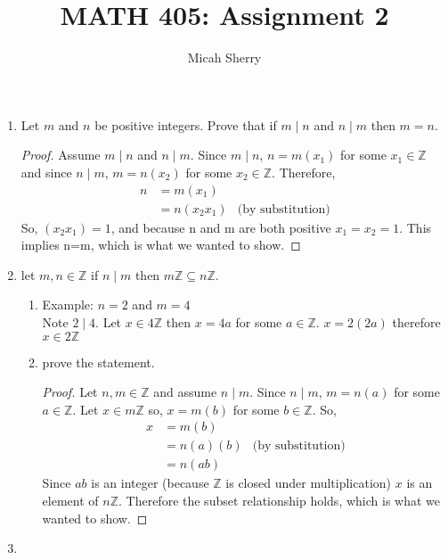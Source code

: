 \documentclass{article}
\title{MATH 405: Assignment 2}
\author{Micah Sherry}
\newcommand{\Z}{\mathbb{Z}}
\newcommand{\divides}{\mid}
\begin{document}
	\maketitle
	\begin{enumerate}
		\item Let $m$ and $n$ be positive integers. Prove that if $m\divides n$ and $n\divides m$ then $m=n$.
		\begin{proof}
			Assume $m\divides n$ and $n\divides m$. 
			Since $m\divides n$, $n = m(x_1)$ for some $x_1 \in \Z$ and since $n\divides m$, $m = n(x_2)$ for some $x_2 \in \Z$. 
			Therefore,
			\begin{align*}
				n &= m(x_1)\\
				  &= n(x_2x_1) & \text{(by substitution)}		  
			\end{align*}
			So, $(x_2x_1) = 1$, and because n and m are both positive $x_1=x_2=1$. This implies n=m, which is what we wanted to show. 
		\end{proof}
		\item let $m, n \in \Z$ if $n\divides m$ then $m\Z \subseteq n\Z.$  
		\begin{enumerate}
			\item Example: $n=2$ and $m=4$\\
				Note $2 \divides 4$.
				Let $x \in 4\Z$ then $x = 4a$ for some $a \in \Z$. $x=2(2a)$ therefore $x \in 2\Z$ 
			\item prove the statement. 
			\begin{proof}
				Let $n,m \in \Z$ and assume $n \divides m$. 
				Since $n \divides m$, $m = n(a)$ for some $a \in \Z$. Let $x \in m\Z$ so, $x =m(b)$ for some $b \in \Z$.
				So, 
				\begin{align*}
				 x &= m(b) \\
				   &= n(a)(b) &\text{(by substitution)}\\
				   &= n(ab)
				\end{align*}
				Since $ab$ is an integer (because $\Z$ is closed under multiplication) $x$ is an element of $n\Z$. Therefore the subset relationship holds, which is what we wanted to show.   
			\end{proof}				
		\end{enumerate}
		\item 
	\end{enumerate}
\end{document}
